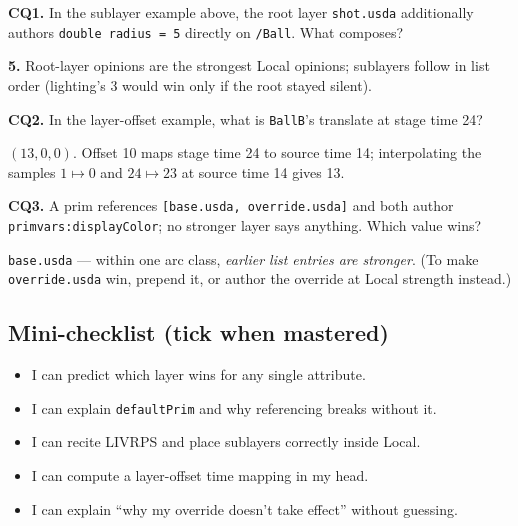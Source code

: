 \noindent\textbf{CQ1.} In the sublayer example above, the root layer
\texttt{shot.usda} additionally authors \texttt{double radius = 5} directly on
\texttt{/Ball}. What composes?
\begin{DrillSolution}
\textbf{5.} Root-layer opinions are the strongest Local opinions; sublayers
follow in list order (lighting's 3 would win only if the root stayed silent).
\end{DrillSolution}

\noindent\textbf{CQ2.} In the layer-offset example, what is
\texttt{BallB}'s translate at stage time 24?
\begin{DrillSolution}
$(13, 0, 0)$. Offset 10 maps stage time 24 to source time 14; interpolating
the samples $1 \mapsto 0$ and $24 \mapsto 23$ at source time 14 gives 13.
\end{DrillSolution}

\noindent\textbf{CQ3.} A prim references \texttt{[base.usda, override.usda]}
and both author \texttt{primvars:displayColor}; no stronger layer says
anything. Which value wins?
\begin{DrillSolution}
\texttt{base.usda} --- within one arc class, \emph{earlier list entries are
stronger}. (To make \texttt{override.usda} win, prepend it, or author the
override at Local strength instead.)
\end{DrillSolution}

\subsection*{Mini-checklist (tick when mastered)}
\begin{itemize}[leftmargin=*]
  \item[$\square$] I can predict which layer wins for any single attribute.
  \item[$\square$] I can explain \texttt{defaultPrim} and why referencing breaks without it.
  \item[$\square$] I can recite LIVRPS and place sublayers correctly inside Local.
  \item[$\square$] I can compute a layer-offset time mapping in my head.
  \item[$\square$] I can explain ``why my override doesn't take effect'' without guessing.
\end{itemize}
